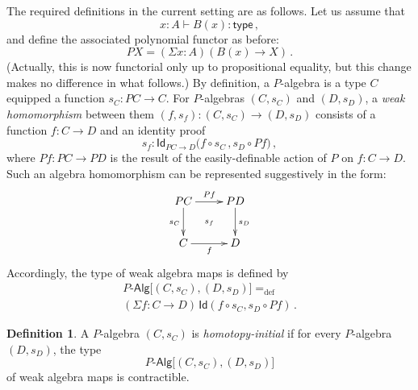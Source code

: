 \documentclass{article}
\newcommand{\defeq}{=_{\mathrm{def}}}
\newcommand{\type}{\mathsf{type}}
\newcommand{\Id}{\mathsf{Id}}
\newcommand{\id}[1]{\Id_{#1}}
\newcommand{\Palg}{P\text{-}\mathsf{Alg}}
\theoremstyle{remark}
\theoremstyle{definition}
\newtheorem{definition}[theorem]{Definition}
\begin{document}
The required definitions in the current setting are as follows. Let us assume that
\[
x:A \vdash B(x) : \type \, ,
\]
and define the associated polynomial functor as before: 
\begin{equation}
\label{eq:polyfunc}
PX = (\Sigma x : A) (B(x) \rightarrow X) \, .
\end{equation}
(Actually, this is now functorial only up to propositional equality, but this change makes no difference in what follows.)
By definition, a $P$-algebra is a type $C$ equipped a function
$s_C :  PC \rightarrow C$. For $P$-algebras $(C,s_C)$ and $(D,s_D)$, a \emph{weak 
homomorphism} between them $(f, s_f) : (C, s_C) \rightarrow (D, s_D)$
consists of a function $f : C \rightarrow D$ and an identity proof
\[
s_f : \id{PC \rightarrow D}\big( f \circ s_C \, ,  s_{D} \circ Pf \big) \, ,
\]
where $Pf : PC\rightarrow PD$ is the result of the easily-definable action of $P$ on $f: C \rightarrow D$. Such an algebra homomorphism can be represented suggestively in the form:
\[
\xymatrix{
 PC \ar[d]_{s_C} \ar[r]^{Pf}  \ar@{}[dr]|{s_f} &  PD \ar[d]^{s_D}\\
C \ar[r]_{f}   & D }
\] 
Accordingly, the type of weak algebra maps is defined by
\begin{multline*}
\Palg
\big[ (C,s_C), (D, s_D)  \big]
 \defeq   \\
(\Sigma f:  C \rightarrow D) \, \Id(f\circ s_C, s_D\circ Pf) \, .
\end{multline*}


\begin{definition} 
A $P$-algebra $(C, s_C)$ is \emph{homotopy-initial} if for every $P$-algebra $(D, s_D)$, the type 
$$\Palg \big[ (C, s_C), (D, s_D) \big]$$ of weak algebra maps is contractible.
\end{definition} 
\end{document}
